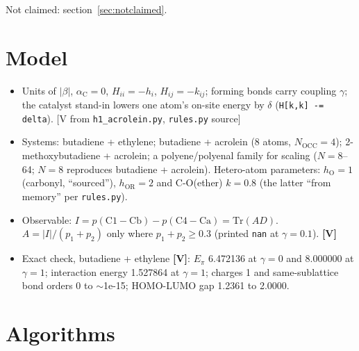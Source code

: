 \documentclass[11pt]{article}
\newcommand{\V}{\textbf{[V]}}
\newcommand{\scr}[1]{\texttt{#1}}
\begin{document}
Not claimed: section~\ref{sec:notclaimed}.

\section{Model}

\begin{itemize}
  \item Units of $|\beta|$, $\alpha_\mathrm{C} = 0$, $H_{ii} = -h_i$, $H_{ij} = -k_{ij}$; forming bonds carry coupling $\gamma$; the catalyst stand-in lowers one atom's on-site energy by $\delta$ (\scr{H[k,k] -= delta}). [V from \scr{h1\_acrolein.py}, \scr{rules.py} source]
  \item Systems: butadiene + ethylene; butadiene + acrolein (8 atoms, $N_\mathrm{OCC} = 4$); 2-methoxybutadiene + acrolein; a polyene/polyenal family for scaling ($N = 8$--64; $N = 8$ reproduces butadiene + acrolein). Hetero-atom parameters: $h_\mathrm{O} = 1$ (carbonyl, ``sourced''), $h_\mathrm{OR} = 2$ and C-O(ether) $k = 0.8$ (the latter ``from memory'' per \scr{rules.py}).
  \item Observable: $I = p(\mathrm{C1{-}Cb}) - p(\mathrm{C4{-}Ca}) = \mathrm{Tr}(A D)$. $A = |I|/(p_1 + p_2)$ only where $p_1 + p_2 \geq 0.3$ (printed \scr{nan} at $\gamma = 0.1$). \V
  \item Exact check, butadiene + ethylene \V: $E_\pi$ 6.472136 at $\gamma = 0$ and 8.000000 at $\gamma = 1$; interaction energy 1.527864 at $\gamma = 1$; charges 1 and same-sublattice bond orders 0 to $\sim$1e-15; HOMO-LUMO gap 1.2361 to 2.0000.
\end{itemize}

\section{Algorithms}
\end{document}
